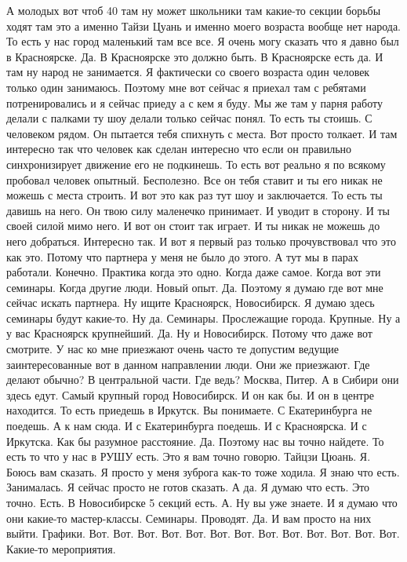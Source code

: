 А молодых вот чтоб 40 там ну может школьники там какие-то секции борьбы ходят там это а именно Тайзи Цуань и именно моего возраста вообще нет народа.
То есть у нас город маленький там все все.
Я очень могу сказать что я давно был в Красноярске.
Да.
В Красноярске это должно быть.
В Красноярске есть да.
И там ну народ не занимается.
Я фактически со своего возраста один человек только один занимаюсь.
Поэтому мне вот сейчас я приехал там с ребятами потренировались и я сейчас приеду а с кем я буду.
Мы же там у парня работу делали с палками ту шоу делали только сейчас понял.
То есть ты стоишь.
С человеком рядом.
Он пытается тебя спихнуть с места.
Вот просто толкает.
И там интересно так что человек как сделан интересно что если он правильно синхронизирует движение его не подкинешь.
То есть вот реально я по всякому пробовал человек опытный.
Бесполезно.
Все он тебя ставит и ты его никак не можешь с места строить.
И вот это как раз тут шоу и заключается.
То есть ты давишь на него.
Он твою силу маленечко принимает.
И уводит в сторону.
И ты своей силой мимо него.
И вот он стоит так играет.
И ты никак не можешь до него добраться.
Интересно так.
И вот я первый раз только прочувствовал что это как это.
Потому что партнера у меня не было до этого.
А тут мы в парах работали.
Конечно.
Практика когда это одно.
Когда даже самое.
Когда вот эти семинары.
Когда другие люди.
Новый опыт.
Да.
Поэтому я думаю где вот мне сейчас искать партнера.
Ну ищите Красноярск, Новосибирск.
Я думаю здесь семинары будут какие-то.
Ну да.
Семинары.
Прослежащие города.
Крупные.
Ну а у вас Красноярск крупнейший.
Да.
Ну и Новосибирск.
Потому что даже вот смотрите.
У нас ко мне приезжают очень часто те допустим ведущие
заинтересованные вот в данном направлении люди.
Они же приезжают.
Где делают обычно?
В центральной части.
Где ведь?
Москва, Питер.
А в Сибири они здесь едут.
Самый крупный город Новосибирск.
И он как бы.
И он в центре находится.
То есть приедешь в Иркутск.
Вы понимаете.
С Екатеринбурга не поедешь.
А к нам сюда.
И с Екатеринбурга поедешь.
И с Красноярска.
И с Иркутска.
Как бы разумное расстояние.
Да.
Поэтому нас вы точно найдете.
То есть то что у нас в РУШУ есть.
Это я вам точно говорю.
Тайцзи Цюань.
Я.
Боюсь вам сказать.
Я просто у меня зуброга как-то тоже ходила.
Я знаю что есть.
Занималась.
Я сейчас просто не готов сказать.
А да.
Я думаю что есть.
Это точно.
Есть.
В Новосибирске 5 секций есть.
А.
Ну вы уже знаете.
И я думаю что они какие-то мастер-классы.
Семинары.
Проводят.
Да.
И вам просто на них выйти.
Графики.
Вот.
Вот.
Вот.
Вот.
Вот.
Вот.
Вот.
Вот.
Вот.
Вот.
Вот.
Вот.
Вот.
Какие-то мероприятия.
